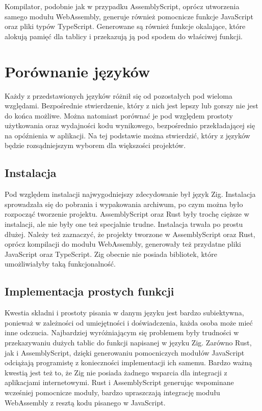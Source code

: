 \documentclass[language=polish,type=master]{aghmodern}
\begin{document}
Kompilator, podobnie jak w przypadku AssemblyScript, oprócz utworzenia samego modułu WebAssembly, generuje również pomocnicze funkcje JavaScript oraz pliki typów TypeScript.
Generowane są również funkcje okalające, które alokują pamięć dla tablicy i przekazują ją pod spodem do właściwej funkcji.

\section{Porównanie języków}
Każdy z przedstawionych języków różnił się od pozostałych pod wieloma względami.
Bezpośrednie stwierdzenie, który z nich jest lepszy lub gorszy nie jest do końca możliwe.
Można natomiast porównać je pod względem prostoty użytkowania oraz wydajności kodu wynikowego, bezpośrednio przekładającej się na opóźnienia w aplikacji.
Na tej podstawie można stwierdzić, który z języków będzie rozsądniejszym wyborem dla większości projektów.

\subsection{Instalacja}
Pod względem instalacji najwygodniejszy zdecydowanie był język Zig.
Instalacja sprowadzała się do pobrania i wypakowania archiwum, po czym można było rozpocząć tworzenie projektu.
AssemblyScript oraz Rust były trochę cięższe w instalacji, ale nie były one też specjalnie trudne.
Instalacja trwała po prostu dłużej.
Należy też zaznaczyć, że projekty tworzone w AssemblyScript oraz Rust, oprócz kompilacji do modułu WebAssembly, generowały też przydatne pliki JavaScript oraz TypeScript.
Zig obecnie nie posiada bibliotek, które umożliwiałyby taką funkcjonalność.

\subsection{Implementacja prostych funkcji}
Kwestia składni i prostoty pisania w danym języku jest bardzo subiektywna, ponieważ w zależności od umiejętności i doświadczenia, każda osoba może mieć inne odczucia.
Najbardziej wyróżniającym się problemem były trudności w przekazywaniu dużych tablic do funkcji napisanej w języku Zig.
Zarówno Rust, jak i AssemblyScript, dzięki generowaniu pomocniczych modułów JavaScript odciążają programistę z konieczności implementacji ich samemu.
Bardzo ważną kwestią jest też to, że Zig nie posiada żadnego wsparcia dla integracji z aplikacjami internetowymi.
Rust i AssemblyScript generując wspominane wcześniej pomocnicze moduły, bardzo upraszczają integrację modułu WebAssembly z resztą kodu pisanego w JavaScript.
\end{document}
